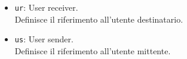 {\begin{itemize}
{\begin{itemize}
{\begin{itemize}
					\item[-] \texttt{add}: Add, aggiungi nuovo utente (vedi \ref{opUReg});
					\item[-] \texttt{udt}: User Data, richiedi dati utente (vedi \ref{opUDT});
					\item[-] \texttt{mod}: Modify, modifica i dati utente (vedi \ref{opUMod});
					\item[-] \texttt{dlt}: Delete, elimina utente (vedi \ref{opUDel}).
				\end{itemize}
			}
		\end{itemize}
		}
		\item[] \texttt{ur}:{ User receiver.\\
		Definisce il riferimento all'utente destinatario.
		}
		\item[] \texttt{us}:{ User sender.\\
		Definisce il riferimento all'utente mittente.
		}	
	\end{itemize}
}

